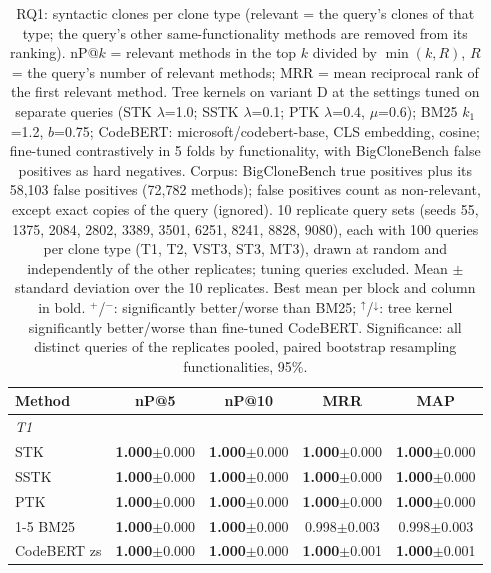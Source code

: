 \begin{table}[!htbp]
\centering
\caption{RQ1: syntactic clones per clone type (relevant = the query's clones of that type; the query's other same-functionality methods are removed from its ranking). nP@$k$ = relevant methods in the top $k$ divided by $\min(k, R)$, $R$ = the query's number of relevant methods; MRR = mean reciprocal rank of the first relevant method. Tree kernels on variant D at the settings tuned on separate queries (STK $\lambda$=1.0; SSTK $\lambda$=0.1; PTK $\lambda$=0.4, $\mu$=0.6); BM25 $k_1$=1.2, $b$=0.75; CodeBERT: microsoft/codebert-base, CLS embedding, cosine; fine-tuned contrastively in 5 folds by functionality, with BigCloneBench false positives as hard negatives. Corpus: BigCloneBench true positives plus its 58,103 false positives (72,782 methods); false positives count as non-relevant, except exact copies of the query (ignored). 10 replicate query sets (seeds 55, 1375, 2084, 2802, 3389, 3501, 6251, 8241, 8828, 9080), each with 100 queries per clone type (T1, T2, VST3, ST3, MT3), drawn at random and independently of the other replicates; tuning queries excluded. Mean $\pm$ standard deviation over the 10 replicates. Best mean per block and column in bold. $^{+}$/$^{-}$: significantly better/worse than BM25; $^{\uparrow}$/$^{\downarrow}$: tree kernel significantly better/worse than fine-tuned CodeBERT. Significance: all distinct queries of the replicates pooled, paired bootstrap resampling functionalities, 95\%.}
\label{tab:rq1}
\footnotesize
\setlength{\tabcolsep}{3.5pt}
\begin{tabular}{lcccc}
\toprule
Method & nP@5 & nP@10 & MRR & MAP \\
\midrule
\multicolumn{5}{l}{\emph{T1}} \\
\quad STK & \textbf{1.000}$\pm$0.000 & \textbf{1.000}$\pm$0.000 & \textbf{1.000}$\pm$0.000 & \textbf{1.000}$\pm$0.000 \\
\quad SSTK & \textbf{1.000}$\pm$0.000 & \textbf{1.000}$\pm$0.000 & \textbf{1.000}$\pm$0.000 & \textbf{1.000}$\pm$0.000 \\
\quad PTK & \textbf{1.000}$\pm$0.000 & \textbf{1.000}$\pm$0.000 & \textbf{1.000}$\pm$0.000 & \textbf{1.000}$\pm$0.000 \\
\cmidrule(lr){1-5}
\quad BM25 & \textbf{1.000}$\pm$0.000 & \textbf{1.000}$\pm$0.000 & 0.998$\pm$0.003 & 0.998$\pm$0.003 \\
\quad CodeBERT zs & \textbf{1.000}$\pm$0.000 & \textbf{1.000}$\pm$0.000 & \textbf{1.000}$\pm$0.001 & \textbf{1.000}$\pm$0.001 \\

\end{tabular}
\end{table}
